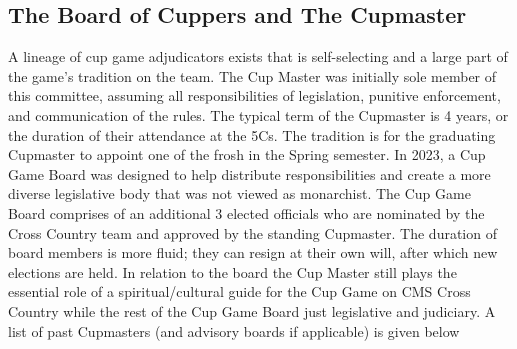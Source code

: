 \documentclass[12pt]{IEEEconf}
\begin{document}
\subsection{The Board of Cuppers and The Cupmaster}
A lineage of cup game adjudicators exists that is self-selecting and a large part of the game's tradition on the team. The Cup Master was initially sole member of this committee, assuming all responsibilities of legislation, punitive enforcement, and communication of the rules. The typical term of the Cupmaster is 4 years, or the duration of their attendance at the 5Cs. The tradition is for the graduating Cupmaster to appoint one of the frosh in the Spring semester. In 2023, a Cup Game Board was designed to help distribute responsibilities and create a more diverse legislative body that was not viewed as monarchist. The Cup Game Board comprises of an additional 3 elected officials who are nominated by the Cross Country team and approved by the standing Cupmaster. The duration of board members is more fluid; they can resign at their own will, after which new elections are held. In relation to the board the Cup Master still plays the essential role of a spiritual/cultural guide for the Cup Game on CMS Cross Country while the rest of the Cup Game Board just legislative and judiciary. A list of past Cupmasters (and advisory boards if  applicable) is given below
\end{document}
